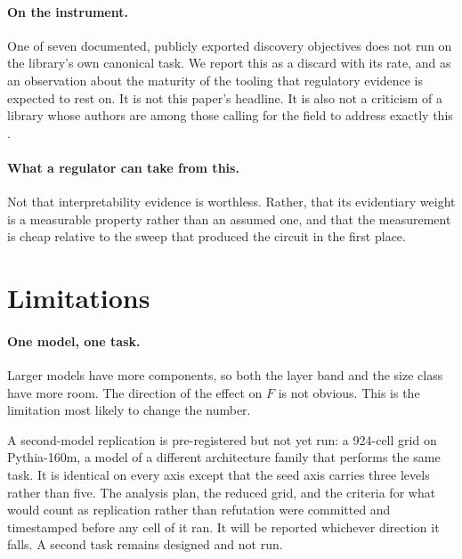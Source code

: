 \documentclass[letterpaper]{article} %
\begin{document}
\paragraph{On the instrument.}
One of seven documented, publicly exported discovery objectives does not run on
the library's own canonical task. We report this as a discard with its rate, and
as an observation about the maturity of the tooling that regulatory evidence is
expected to rest on. It is not this paper's headline. It is also not a criticism
of a library whose authors are among those calling for the field to address
exactly this \citep{sharkey2025}.

\paragraph{What a regulator can take from this.}
Not that interpretability evidence is worthless. Rather, that its evidentiary
weight is a measurable property rather than an assumed one, and that the
measurement is cheap relative to the sweep that produced the circuit in the
first place.

\section{Limitations}

\paragraph{One model, one task.}
Larger models have more components, so both the layer band and the size class
have more room. The direction of the effect on $F$ is not obvious. This is the
limitation most likely to change the number.

A second-model replication is pre-registered but not yet run: a 924-cell grid on
Pythia-160m, a model of a different architecture family that performs the same
task. It is identical on every axis except that the seed axis carries three
levels rather than five. The analysis plan, the reduced grid, and the criteria
for what would count as replication rather than refutation were committed and
timestamped before any cell of it ran. It will be reported whichever direction
it falls. A second task remains designed and not run.
\end{document}

